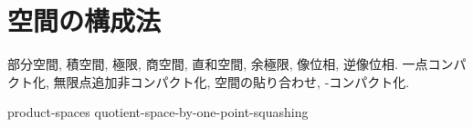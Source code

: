 \documentclass[uplatex, dvipdfmx, a4paper, 12pt, class=jsbook, crop=false]{standalone}
\begin{document}
\chapter{空間の構成法}
\label{chap:constructions}

部分空間, 積空間, 極限, 商空間, 直和空間, 余極限, 像位相, 逆像位相.
一点コンパクト化, 無限点追加非コンパクト化, 空間の貼り合わせ, \Stone-\Cech コンパクト化.

{product-spaces}
{quotient-space-by-one-point-squashing}
\end{document}
